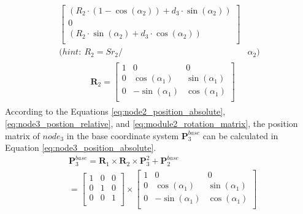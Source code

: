 \begin{itemize}
\begin{align}
\begin{bmatrix}
            (R_2\cdot(1-\cos(\alpha_2)) + d_3\cdot \sin(\alpha_2)) \\
            0 \\
            (R_2\cdot \sin(\alpha_2) + d_3\cdot \cos(\alpha_2)) \\
        \end{bmatrix}&
        \label{eq:node3_postion_relative} \\
        \nonumber (hint: \ R_2 = {Sr}_2/ &\alpha_2)
    \end{align}
    \vspace{-15mm}
    \begin{align}
        &\begin{aligned}
            \textbf{R}_{2} = 
            \begin{bmatrix}
                1 & 0 & 0 \\
                0 & \cos(\alpha_1) & \sin(\alpha_1) \\
                0 & -\sin(\alpha_1) & \cos(\alpha_1) \\
            \end{bmatrix}
        \end{aligned}
        \label{eq:module2_rotation_matrix}
    \end{align}
    According to the Equations \ref{eq:node2_position_absolute}, \ref{eq:node3_postion_relative}, and 
    \ref*{eq:module2_rotation_matrix},     the position matrix of $node_{3}$ in the base coordinate system 
    $\textbf{P}_{3}^{base}$ can be calculated in Equation \ref{eq:node3_position_absolute}.
    \begin{align}
        &\textbf{P}_{3}^{base} = \textbf{R}_{1} \times \textbf{R}_{2} \times \textbf{P}_{3}^{2} + \textbf{P}_{2}^{base} \nonumber \\
        &= 
        \begin{bmatrix}
            1 & 0 & 0 \\
            0 & 1 & 0 \\
            0 & 0 & 1 \\
        \end{bmatrix}
        \times
        \begin{bmatrix}
            1 & 0 & 0 \\
            0 & \cos(\alpha_1) & \sin(\alpha_1) \\
            0 & -\sin(\alpha_1) & \cos(\alpha_1) \\
        \end{bmatrix} \nonumber \\

\end{align}
\end{itemize}
